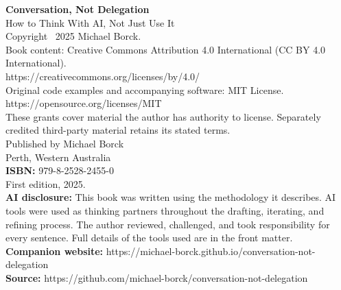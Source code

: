 \thispagestyle{empty}
\vspace*{\fill}

\begin{flushleft}
\textbf{Conversation, Not Delegation}\\
How to Think With AI, Not Just Use It\\[1.5em]
Copyright \textcopyright\ 2025 Michael Borck.\\[1em]
Book content: Creative Commons Attribution 4.0 International (CC BY 4.0 International).\\
https://creativecommons.org/licenses/by/4.0/\\[0.5em]
Original code examples and accompanying software: MIT License.\\
https://opensource.org/licenses/MIT\\[0.5em]
These grants cover material the author has authority to license. Separately credited third-party material retains its stated terms.\\[1em]
Published by Michael Borck\\
Perth, Western Australia\\[1em]
\textbf{ISBN:} 979-8-2528-2455-0\\[1em]
First edition, 2025.\\[1em]
\textbf{AI disclosure:} This book was written using the methodology it describes. AI tools were used as thinking partners throughout the drafting, iterating, and refining process. The author reviewed, challenged, and took responsibility for every sentence. Full details of the tools used are in the front matter.\\[1em]
\textbf{Companion website:} https://michael-borck.github.io/conversation-not-delegation\\
\textbf{Source:} https://github.com/michael-borck/conversation-not-delegation
\end{flushleft}

\vspace*{\fill}
\clearpage
